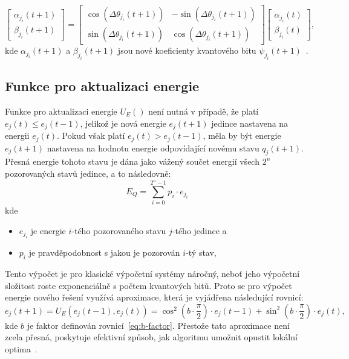 \begin{equation*}
    \begin{bmatrix}
        \alpha_{j_i}\left(t+1\right) \\
        \beta_{j_i}\left(t+1\right)
    \end{bmatrix}
    =
    \begin{bmatrix}
        \cos{\left( \Delta\theta_{j_i}\left(t+1\right) \right)} & - \sin{\left( \Delta\theta_{j_i}\left(t+1\right) \right)} \\
        \sin{\left( \Delta\theta_{j_i}\left(t+1\right) \right)} &   \cos{\left( \Delta\theta_{j_i}\left(t+1\right) \right)}
    \end{bmatrix}
    \begin{bmatrix}
        \alpha_{j_i}\left(t\right) \\
        \beta_{j_i}\left(t\right) 
    \end{bmatrix},
\end{equation*}
kde $\alpha_{j_i}\left(t+1\right)$ a $\beta_{j_i}\left(t+1\right)$ jsou nové koeficienty kvantového bitu $\psi_{j_i}\left(t+1\right)$~\cite{qisa}.

\subsection{Funkce pro aktualizaci energie}\label{subsec:qisa-upd}
Funkce pro aktualizaci energie $U_E\left(\right)$ není nutná v případě, že platí $e_j\left(t\right) \leq e_j\left(t-1\right)$, jelikož je nová energie $e_j\left(t+1\right)$ jedince nastavena na energii $e_j\left(t\right)$. 
Pokud však platí $e_j\left(t\right) > e_j\left(t-1\right)$, měla by být energie $e_j\left(t+1\right)$ nastavena na hodnotu energie odpovídající novému stavu $q_j\left(t+1\right)$. 
Přesná energie tohoto stavu je dána jako vážený součet energií všech $2^n$ pozorovaných stavů jedince, a to následovně:
\begin{equation*}
    E_Q = \sum_{i=0}^{2^n-1} p_i \cdot e_{j_i}
\end{equation*}
kde 
\begin{itemize}
    \item $e_{j_i}$ je energie $i$-tého pozorovaného stavu $j$-tého jedince a
    \item $p_i$ je pravděpodobnost s jakou je pozorován $i$-tý stav,
\end{itemize}
Tento výpočet je pro klasické výpočetní systémy náročný, neboť jeho výpočetní složitost roste exponenciálně s počtem kvantových bitů. 
Proto se pro výpočet energie nového řešení využívá aproximace, která je vyjádřena následující rovnicí:
\begin{equation*}
    e_j\left(t+1\right) = U_E\left(e_j\left(t-1\right), e_j\left(t\right)\right) = \cos^2{\left(b \cdot \frac{\pi}{2}\right)} \cdot e_j\left(t-1\right) + \sin^2{\left(b \cdot \frac{\pi}{2}\right)} \cdot e_j\left(t\right),
\end{equation*}
kde $b$ je faktor definován rovnicí~\ref{eq:b-factor}. 
Přestože tato aproximace není zcela přesná, poskytuje efektivní způsob, jak algoritmu umožnit opustit lokální optima~\cite{qisa}. 


